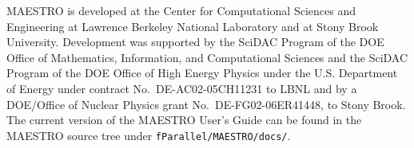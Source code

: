 MAESTRO is developed at the Center for Computational Sciences and
Engineering at Lawrence Berkeley National Laboratory and at Stony
Brook University.  Development was supported by the SciDAC Program of
the DOE Office of Mathematics, Information, and Computational Sciences
and the SciDAC Program of the DOE Office of High Energy Physics under
the U.S. Department of Energy under contract No.\ DE-AC02-05CH11231 to
LBNL and by a DOE/Office of Nuclear Physics grant No.\
DE-FG02-06ER41448, to Stony Brook. \\

\noindent The current version of the MAESTRO User's Guide can be found in 
the MAESTRO source tree under {\tt fParallel/MAESTRO/docs/}.
